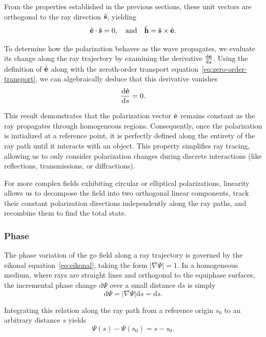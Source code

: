 From the properties established in the previous sections, these unit vectors are orthogonal to the ray direction $\hat{\mathbf{s}}$, yielding
\begin{equation}
  \hat{\mathbf{e}} \cdot \hat{\mathbf{s}} = 0, \quad \text{and} \quad \hat{\mathbf{h}} = \hat{\mathbf{s}} \times \hat{\mathbf{e}}.
\end{equation}

To determine how the polarization behaves as the wave propagates, we evaluate its change along the ray trajectory by examining the derivative $\tfrac{\mathrm{d}\hat{\mathbf{e}}}{\mathrm{d}s}$. Using the definition of $\hat{\mathbf{e}}$ along with the zeroth-order transport equation~\eqref{eq:zero-order-transport}, we can algebraically deduce that this derivative vanishes
\begin{equation}
  \frac{\mathrm{d}\hat{\mathbf{e}}}{\mathrm{d}s} = 0.
\end{equation}

This result demonstrates that the polarization vector $\hat{\mathbf{e}}$ remains constant as the ray propagates through homogeneous regions. Consequently, once the polarization is initialized at a reference point, it is perfectly defined along the entirety of the ray path until it interacts with an object. This property simplifies ray tracing, allowing us to only consider polarization changes during discrete interactions (like reflections, transmissions, or diffractions).

For more complex fields exhibiting circular or elliptical polarizations, linearity allows us to decompose the field into two orthogonal linear components, track their constant polarization directions independently along the ray paths, and recombine them to find the total state.

\subsubsection{Phase}

The phase variation of the \gls{go} field along a ray trajectory is governed by the eikonal equation~\eqref{eq:eikonal}, taking the form $|\nabla \Psi| = 1$. In a homogeneous medium, where rays are straight lines and orthogonal to the equiphase surfaces, the incremental phase change $\mathrm{d}\Psi$ over a small distance $\mathrm{d}s$ is simply
\begin{equation}
  \mathrm{d}\Psi = |\nabla \Psi| \mathrm{d}s = \mathrm{d}s.
\end{equation}

Integrating this relation along the ray path from a reference origin $s_0$ to an arbitrary distance $s$ yields
\begin{equation}
  \Psi(s) - \Psi(s_0) = s - s_0.
\end{equation}

